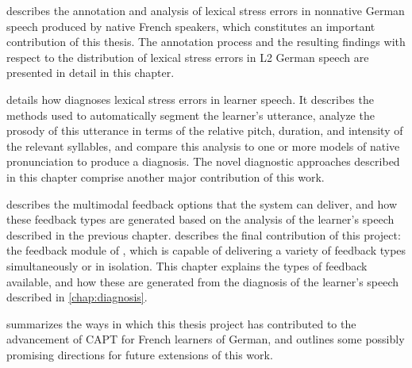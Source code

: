 describes 
the annotation and analysis of lexical stress errors in 
nonnative German speech produced by native French speakers, which constitutes an important contribution of this thesis. 
The annotation process and the resulting findings with respect to the distribution of lexical stress errors in L2 German speech are presented in detail in this chapter.

 details how  diagnoses lexical stress errors in learner speech. It describes the methods used to automatically segment the learner's utterance, analyze the prosody of this utterance in terms of the relative pitch, duration, and intensity of the relevant syllables, and compare this analysis to one or more models of native pronunciation to produce a diagnosis. The novel diagnostic approaches described in this chapter comprise another major contribution of this work. 

 describes the multimodal feedback options that the system can deliver, and how these feedback types are generated based on the analysis of the learner's speech described in the previous chapter. 
describes the final contribution of this project: the feedback module of , which is capable of delivering a variety of feedback types simultaneously or in isolation. 
This chapter explains the types of feedback available, and how these are generated from the diagnosis of the learner's speech described in \cref{chap:diagnosis}.


 summarizes the ways in which this thesis project has contributed to the advancement of CAPT for French learners of German,
and
outlines some
possibly promising directions for future extensions of this work.




